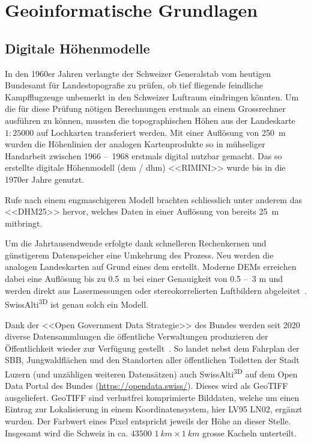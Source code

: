 \clearpage
\section{Geoinformatische Grundlagen}

\subsection{Digitale Höhenmodelle}\label{sec:dem}

In den 1960er Jahren verlangte der Schweizer Generalstab vom heutigen Bundesamt für Landestopografie zu prüfen, ob tief fliegende feindliche Kampfflugzeuge unbemerkt in den Schweizer Luftraum eindringen könnten. Um die für diese Prüfung nötigen Berechnungen erstmals an einem Grossrechner ausführen zu können, mussten die topographischen Höhen aus der Landeskarte $1:25000$ auf Lochkarten transferiert werden. Mit einer Auflösung von \qty{250}{m} wurden die Höhenlinien der analogen Kartenprodukte so in mühseliger Handarbeit zwischen 1966 --~1968 erstmals digital nutzbar gemacht. Das so erstellte digitale Höhenmodell (\acrshort{dem} / \acrshort{dhm}) <<RIMINI>> wurde bis in die 1970er Jahre genutzt.~\cite{swisstopohistdem}

Rufe nach einem engmaschigeren Modell brachten schliesslich unter anderem das <<DHM25>> hervor, welches Daten in einer Auflösung von bereits \qty{25}{m} mitbringt.~\cite{swisstopohistdem}

Um die Jahrtausendwende erfolgte dank schnelleren Rechenkernen und günstigerem Datenspeicher eine Umkehrung des Prozess. Neu werden die analogen Landeskarten auf Grund eines \acrshort{dem} erstellt. Moderne DEMs erreichen dabei eine Auflösung bis zu \qty{0.5}{m} bei einer Genauigkeit von 0.5 --~3 \unit{m} und werden direkt aus Lasermessungen oder stereokorrelierten Luftbildern abgeleitet~\cite{alti3dprod}. SwissAlti\textsuperscript{3D} ist genau solch ein Modell.

Dank der <<Open Government Data Strategie>> des Bundes werden seit 2020 diverse Datensammlungen die öffentliche Verwaltungen produzieren der Öffentlichkeit wieder zur Verfügung gestellt~\cite{opendataswiss}.
So landet nebst dem Fahrplan der SBB, Jungwaldflächen und den Standorten aller öffentlichen Toiletten der Stadt Luzern (und unzähligen weiteren Datensätzen) auch  SwissAlti\textsuperscript{3D} auf dem Open Data Portal des Bundes (\url{https://opendata.swiss/}).
Dieses wird als GeoTIFF ausgeliefert. GeoTIFF sind verlustfrei komprimierte Bilddaten, welche um einen Eintrag zur Lokalisierung in einem Koordinatensystem, hier LV95 LN02, ergänzt wurden. Der Farbwert eines Pixel entspricht jeweils der Höhe an dieser Stelle. Insgesamt wird die Schweiz in ca. $43500$ $\qty{1}{km} \times \qty{1}{km}$ grosse Kacheln unterteilt.~\cite{alti3dprod} 

